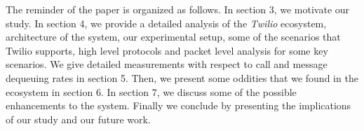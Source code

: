  
 The reminder of the paper is organized as follows. In section 3, we motivate our study. In section 4, we provide a detailed analysis of the \textit{Twilio} ecosystem, architecture of the system, our experimental setup, some of the scenarios that Twilio supports, high level protocols and packet level analysis for some key scenarios. We give detailed measurements with respect to call and message dequeuing rates in section 5. Then, we present some oddities that we found in the ecosystem in section 6. In section 7, we discuss some of the possible enhancements to the system. Finally we conclude by presenting the implications of our study and our future work. 